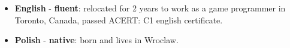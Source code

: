 \documentclass[12pt,a4paper]{article}
\begin{document}
\begin{multicols}{2}
\justifying
\begin{itemize}[leftmargin=4.5cm]
	\section*{Languages }
	\setlength\itemsep{0.0cm}
	\item \textbf{English} - \textbf{fluent}: relocated for 2 years to work as a game programmer in Toronto, Canada, passed ACERT: C1 english certificate.
	\item \textbf{Polish} - \textbf{native}: born and lives in Wroclaw.
\end{itemize} 

\vspace{1cm}

\vfill

\end{multicols}

\vfill
\end{document}
